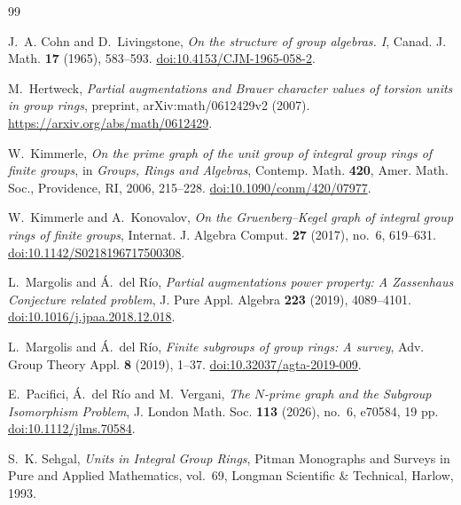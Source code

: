 \documentclass[11pt,a4paper]{article}
\theoremstyle{remark}
\begin{document}
\small
\begin{thebibliography}{99}

J.~A. Cohn and D.~Livingstone,
\emph{On the structure of group algebras. I},
Canad. J. Math. \textbf{17} (1965), 583--593.
\href{https://doi.org/10.4153/CJM-1965-058-2}
{doi:10.4153/CJM-1965-058-2}.

M.~Hertweck,
\emph{Partial augmentations and Brauer character values of torsion units in
group rings}, preprint, arXiv:math/0612429v2 (2007).
\url{https://arxiv.org/abs/math/0612429}.

W.~Kimmerle,
\emph{On the prime graph of the unit group of integral group rings of finite
groups}, in \emph{Groups, Rings and Algebras}, Contemp. Math. \textbf{420},
Amer. Math. Soc., Providence, RI, 2006, 215--228.
\href{https://doi.org/10.1090/conm/420/07977}
{doi:10.1090/conm/420/07977}.

W.~Kimmerle and A.~Konovalov,
\emph{On the Gruenberg--Kegel graph of integral group rings of finite
groups}, Internat. J. Algebra Comput. \textbf{27} (2017), no.~6, 619--631.
\href{https://doi.org/10.1142/S0218196717500308}
{doi:10.1142/\discretionary{}{}{}S0218196717500308}.

L.~Margolis and \'A.~del R\'io,
\emph{Partial augmentations power property: A Zassenhaus Conjecture related
problem}, J. Pure Appl. Algebra \textbf{223} (2019), 4089--4101.
\href{https://doi.org/10.1016/j.jpaa.2018.12.018}
{doi:10.1016/j.jpaa.2018.12.018}.

L.~Margolis and \'A.~del R\'io,
\emph{Finite subgroups of group rings: A survey},
Adv. Group Theory Appl. \textbf{8} (2019), 1--37.
\href{https://doi.org/10.32037/agta-2019-009}
{doi:10.32037/agta-2019-009}.

E.~Pacifici, \'A.~del R\'io and M.~Vergani,
\emph{The $N$-prime graph and the Subgroup Isomorphism Problem},
J. London Math. Soc. \textbf{113} (2026), no.~6, e70584, 19 pp.
\href{https://doi.org/10.1112/jlms.70584}
{doi:10.1112/jlms.70584}.

S.~K. Sehgal,
\emph{Units in Integral Group Rings},
Pitman Monographs and Surveys in Pure and Applied Mathematics, vol.~69,
Longman Scientific \& Technical, Harlow, 1993.

\end{thebibliography}
\end{document}
